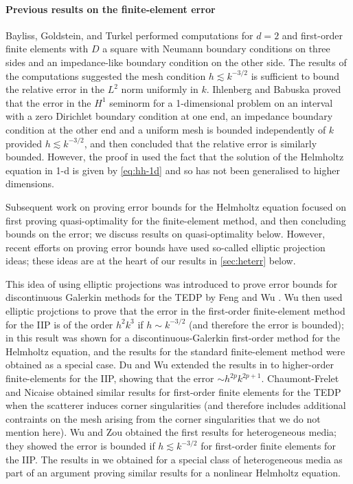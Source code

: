 \paragraph{Previous results on the finite-element error} Bayliss, Goldstein, and Turkel \cite[\S 3]{BaGoTu:85} performed computations for $d=2$ and first-order finite elements with $D$ a square with Neumann boundary conditions on three sides and an impedance-like boundary condition on the other side. The results of the computations suggested the mesh condition $h \lesssim k^{-3/2}$ is sufficient to bound the relative error in the $L^2$ norm uniformly in $k.$ Ihlenberg and Babuska \cite[Theorem 5, \S 3.4]{IhBa:95} proved that the error in the $H^1$ seminorm for a 1-dimensional problem on an interval with a zero Dirichlet boundary condition at one end, an impedance boundary condition at the other end and a uniform mesh is bounded independently of $k$ provided $h \lesssim k^{-3/2}$, and then concluded that the relative error is similarly bounded. However, the proof in \cite{IhBa:95} used the fact that the solution of the Helmholtz equation in 1-d is given by \eqref{eq:hh-1d} and so has not been generalised to higher dimensions.

Subsequent work on proving error bounds for the Helmholtz equation focused on first proving quasi-optimality for the finite-element method, and then concluding bounds on the error; we discuss results on quasi-optimality below. However, recent efforts on proving error bounds have used so-called elliptic projection ideas; these ideas are at the heart of our results in \cref{sec:heterr} below.

This idea of using elliptic projections was introduced to prove error bounds for discontinuous Galerkin methods for the TEDP by Feng and Wu \cite{FeWu:09,FeWu:11}. Wu \cite{Wu:14} then used elliptic projctions to prove that the error in the first-order finite-element method for the IIP is of the order $ h^2k^3$ if $h \sim k^{-3/2}$ (and therefore the error is bounded); in \cite{Wu:14} this result was shown for a discontinuous-Galerkin first-order method for the Helmholtz equation, and the results for the standard finite-element method were obtained as a special case. Du and Wu \cite{DuWu:15} extended the results in \cite{Wu:14} to higher-order finite-elements for the IIP, showing that the error $\sim h^{2p}k^{2p+1}.$ Chaumont-Frelet and Nicaise \cite{ChNi:18} obtained similar results for first-order finite elements for the TEDP when the scatterer induces corner singularities (and therefore \cite{ChNi:18} includes additional contraints on the mesh arising from the corner singularities that we do not mention here). Wu and Zou \cite[Lemma 3.3]{WuZo:18} obtained the first results for heterogeneous media; they showed the error is bounded if $h \lesssim k^{-3/2}$ for first-order finite elements for the IIP. The results in \cite{WuZo:18} we obtained for a special class of heterogeneous media as part of an argument proving similar results for a nonlinear Helmholtz equation.


